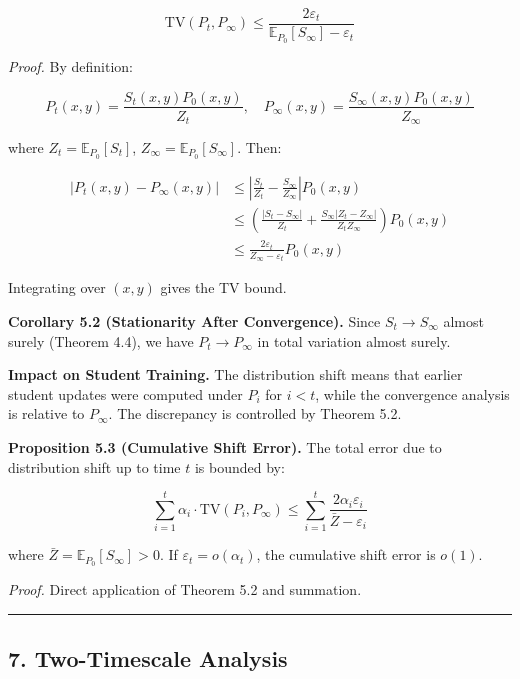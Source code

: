 \documentclass[
  12pt,
]{article}
\begin{document}
\[
\text{TV}(P_t, P_\infty) \leq \frac{2\varepsilon_t}{\mathbb{E}_{P_0}[S_\infty] - \varepsilon_t}
\]

\emph{Proof.} By definition:

\[
P_t(x,y) = \frac{S_t(x,y) P_0(x,y)}{Z_t}, \quad P_\infty(x,y) = \frac{S_\infty(x,y) P_0(x,y)}{Z_\infty}
\]

where \(Z_t = \mathbb{E}_{P_0}[S_t]\),
\(Z_\infty = \mathbb{E}_{P_0}[S_\infty]\). Then:

\[
\begin{aligned}
|P_t(x,y) - P_\infty(x,y)| &\leq \left| \frac{S_t}{Z_t} - \frac{S_\infty}{Z_\infty} \right| P_0(x,y) \\
&\leq \left( \frac{|S_t - S_\infty|}{Z_t} + \frac{S_\infty|Z_t - Z_\infty|}{Z_t Z_\infty} \right) P_0(x,y) \\
&\leq \frac{2\varepsilon_t}{Z_\infty - \varepsilon_t} P_0(x,y)
\end{aligned}
\]

Integrating over \((x,y)\) gives the TV bound.

\textbf{Corollary 5.2 (Stationarity After Convergence).} Since
\(S_t \to S_\infty\) almost surely (Theorem 4.4), we have
\(P_t \to P_\infty\) in total variation almost surely.

\textbf{Impact on Student Training.} The distribution shift means that
earlier student updates were computed under \(P_i\) for \(i < t\), while
the convergence analysis is relative to \(P_\infty\). The discrepancy is
controlled by Theorem 5.2.

\textbf{Proposition 5.3 (Cumulative Shift Error).} The total error due
to distribution shift up to time \(t\) is bounded by:

\[
\sum_{i=1}^t \alpha_i \cdot \text{TV}(P_i, P_\infty) \leq \sum_{i=1}^t \frac{2\alpha_i \varepsilon_i}{\bar{Z} - \varepsilon_i}
\]

where \(\bar{Z} = \mathbb{E}_{P_0}[S_\infty] > 0\). If
\(\varepsilon_t = o(\alpha_t)\), the cumulative shift error is \(o(1)\).

\emph{Proof.} Direct application of Theorem 5.2 and summation.

\begin{center}\rule{0.5\linewidth}{0.5pt}\end{center}

\subsection{7. Two-Timescale Analysis}\label{two-timescale-analysis}
\end{document}
